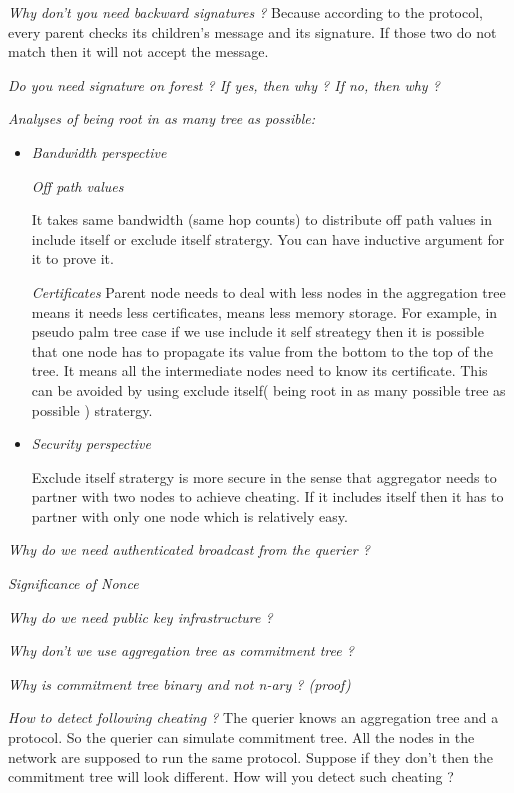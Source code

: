 \textit{Why don't you need backward signatures ?} Because according to the protocol, every parent checks its children's message and its signature. If those two do not match then it will not accept the message.

\textit{Do you need signature on forest ? If yes, then why ? If no, then why ?}

\textit{Analyses of being root in as many tree as possible:}
	
	\begin{itemize}
		\item \textit{Bandwidth perspective}
	
			\textit{Off path values}
				
				It takes same bandwidth (same hop counts) to distribute off path values in include itself or exclude itself stratergy. You can have inductive argument for it to prove it.

			\textit{Certificates}
				Parent node needs to deal with less nodes in the aggregation tree means it needs less certificates, means less memory storage. For example, in pseudo palm tree case if we use include it self streategy then it is possible that one node has to propagate its value from the bottom to the top of the tree. It means all the intermediate nodes need to know its certificate. This can be avoided by using exclude itself( being root in as many possible tree as possible ) stratergy.

		\item \textit{Security perspective}

				Exclude itself stratergy is more secure in the sense that aggregator needs to partner with two nodes to achieve cheating. If it includes itself then it has to partner with only one node which is relatively easy.

	\end{itemize}

\textit{Why do we need authenticated broadcast from the querier ?}

\textit{Significance of Nonce}

\textit{Why do we need public key infrastructure ?}

\textit{Why don't we use aggregation tree as commitment tree ?}

\textit{Why is commitment tree binary and not n-ary ? (proof)}

\textit{How to detect following cheating ?}
	The querier knows an aggregation tree and a protocol. So the querier can simulate commitment tree.
	All the nodes in the network are supposed to run the same protocol. Suppose if they don't then the commitment tree will look different. How will you detect such cheating ?

